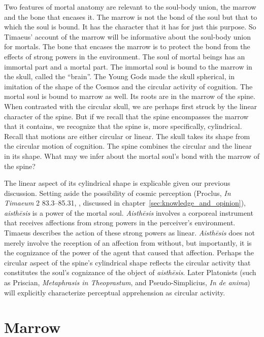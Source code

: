Two features of mortal anatomy are relevant to the soul-body union, the marrow and the bone that encases it. The marrow is not the bond of the soul but that to which the soul is bound. It has the character that it has for just this purpose. So Timaeus' account of the marrow will be informative about the soul-body union for mortals. The bone that encases the marrow is to protect the bond from the effects of strong powers in the environment. The soul of mortal beings has an immortal part and a mortal part. The immortal soul is bound to the marrow in the skull, called the ``brain''. The Young Gods made the skull spherical, in imitation of the shape of the Cosmos and the circular activity of cognition. The mortal soul is bound to marrow as well. Its roots are in the marrow of the spine. When contrasted with the circular skull, we are perhaps first struck by the linear character of the spine. But if we recall that the spine encompasses the marrow that it contains, we recognize that the spine is, more specifically, cylindrical. Recall that motions are either circular or linear. The skull takes its shape from the circular motion of cognition. The spine combines the circular and the linear in its shape. What may we infer about the mortal soul's bond with the marrow of the spine?

The linear aspect of its cylindrical shape is explicable given our previous discussion. Setting aside the possibility of cosmic perception (Proclus, \emph{In Timaeum} 2 83.3–85.31, \citealt{Diehl:1903re}, discussed in chapter~\ref{sec:knowledge_and_opinion}), \emph{aisthēsis} is a power of the mortal soul. \emph{Aisthēsis} involves a corporeal instrument that receives affections from strong powers in the perceiver's environment. Timaeus describes the action of these strong powers as linear. \emph{Aisthēsis} does not merely involve the reception of an affection from without, but importantly, it is the cognizance of the power of the agent that caused that affection. Perhaps the circular aspect of the spine's cylindrical shape reflects the circular activity that constitutes the soul's cognizance of the object of \emph{aisthēsis}. Later Platonists (such as Priscian, \emph{Metaphrasis in Theoprastum}, and Pseudo-Simplicius, \emph{In de anima}) will explicitly characterize perceptual apprehension as circular activity.


\section{Marrow} %
\label{sec:marrow}

